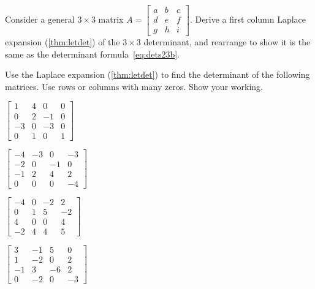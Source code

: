 \begin{exercise} \label{ex:} 
Consider a general \(3\times3\) matrix \(A=\begin{bmatrix} a&b&c \\d&e&f\\ g&h&i \end{bmatrix}\).
Derive a first column Laplace expansion (\autoref{thm:letdet}) of the \(3\times3\) determinant, and rearrange to show it is the same as the determinant formula~\eqref{eq:dets23b}.
\end{exercise}





\begin{exercise} \label{ex:} 
Use the Laplace expansion (\autoref{thm:letdet}) to find the determinant of the following matrices.  
Use rows or columns with many zeros.
Show your working.
\begin{parts}
\item \(\begin{bmatrix} 1 & 4 & 0 & 0
\\0 & 2 & -1 & 0
\\-3 & 0 & -3 & 0
\\0 & 1 & 0 & 1 \end{bmatrix}\)

\item \(\begin{bmatrix} -4 & -3 & 0 & -3
\\-2 & 0 & -1 & 0
\\-1 & 2 & 4 & 2
\\0 & 0 & 0 & -4 \end{bmatrix}\)

\item \(\begin{bmatrix} -4 & 0 & -2 & 2
\\0 & 1 & 5 & -2
\\4 & 0 & 0 & 4
\\-2 & 4 & 4 & 5 \end{bmatrix}\)

\item \(\begin{bmatrix} 3 & -1 & 5 & 0
\\1 & -2 & 0 & 2
\\-1 & 3 & -6 & 2
\\0 & -2 & 0 & -3 \end{bmatrix}\)


\end{parts}
\end{exercise}
